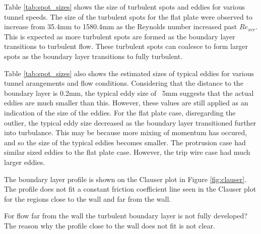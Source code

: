 \documentclass{article}
\begin{document}

Table \ref{tab:spot_sizes} shows the size of turbulent spots and eddies for various tunnel speeds.
The size of the turbulent spots for the flat plate were observed to increase from 35.4mm to 1580.4mm as the Reynolds number increased past $Re_{xcr}$.
This is expected as more turbulent spots are formed as the boundary layer transitions to turbulent flow.
These turbulent spots can coalesce to form larger spots as the boundary layer transitions to fully turbulent.


Table \ref{tab:spot_sizes} also shows the estimated sizes of typical eddies for various tunnel arangements and flow conditions.
Considering that the distance to the boundary layer is 0.2mm, the typical eddy size of ~5mm suggests that the actual eddies are much smaller than this.
However, these values are still applied as an indication of the size of the eddies.
For the flat plate case, disregarding the outlier, the typical eddy size decreased as the boundary layer transitioned further into turbulance.
This may be because more mixing of momentum has occured, and so the size of the typical eddies becomes smaller.
The protrusion case had similar sized eddies to the flat plate case.
However, the trip wire case had much larger eddies.


The boundary layer profile is shown on the Clauser plot in Figure \ref{fig:clauser}.
The profile does not fit a constant friction coefficient line seen in the Clauser plot for the regions close to the wall and far from the wall.

For flow far from the wall the turbulent boundary layer is not fully developed?
The reason why the profile close to the wall does not fit is not clear.
\end{document}
